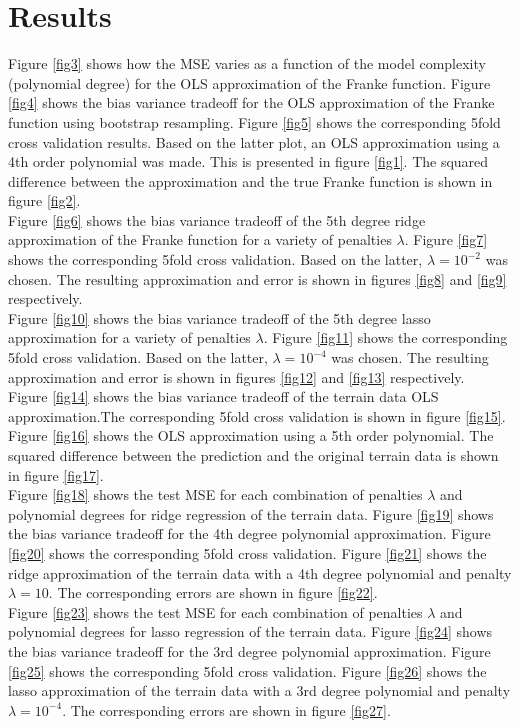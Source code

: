 \documentclass[notitlepage, reprint, nofootinbib]{revtex4-1}
\begin{document}
\section{Results}
Figure \ref{fig3} shows how the MSE varies as a function of the model complexity (polynomial degree) for the OLS approximation of the Franke function. Figure \ref{fig4} shows the bias variance tradeoff for the OLS approximation of the Franke function using bootstrap resampling. Figure \ref{fig5} shows the corresponding 5fold cross validation results. Based on the latter plot, an OLS approximation using a 4th order polynomial was made. This is presented in figure \ref{fig1}. The squared difference between the approximation and the true Franke function is shown in figure \ref{fig2}. \\[2mm]
Figure \ref{fig6} shows the bias variance tradeoff of the 5th degree ridge approximation of the Franke function for a variety of penalties $\lambda$. Figure \ref{fig7} shows the corresponding 5fold cross validation. Based on the latter, $\lambda=10^{-2}$ was chosen. The resulting approximation and error is shown in figures \ref{fig8} and \ref{fig9} respectively. \\[2mm]
Figure \ref{fig10} shows the bias variance tradeoff of the 5th degree lasso approximation for a variety of penalties $\lambda$. Figure \ref{fig11} shows the corresponding 5fold cross validation. Based on the latter, $\lambda=10^{-4}$ was chosen. The resulting approximation and error is shown in figures \ref{fig12} and \ref{fig13} respectively. \\[2mm]
Figure \ref{fig14} shows the bias variance tradeoff of the terrain data OLS approximation.The corresponding 5fold cross validation is shown in figure \ref{fig15}. Figure \ref{fig16} shows the OLS approximation using a 5th order polynomial. The squared difference between the prediction and the original terrain data is shown in figure \ref{fig17}.\\[2mm]
Figure \ref{fig18} shows the test MSE for each combination of penalties $\lambda$ and polynomial degrees for ridge regression of the terrain data. Figure \ref{fig19} shows the bias variance tradeoff for the 4th degree polynomial approximation. Figure \ref{fig20} shows the corresponding 5fold cross validation. Figure \ref{fig21} shows the ridge approximation of the terrain data with a 4th degree polynomial and penalty $\lambda=10$. The corresponding errors are shown in figure \ref{fig22}.\\[2mm]
Figure \ref{fig23} shows the test MSE for each combination of penalties $\lambda$ and polynomial degrees for lasso regression of the terrain data. Figure \ref{fig24} shows the bias variance tradeoff for the 3rd degree polynomial approximation. Figure \ref{fig25} shows the corresponding 5fold cross validation. Figure \ref{fig26} shows the lasso approximation of the terrain data with a 3rd degree polynomial and penalty $\lambda=10^{-4}$. The corresponding errors are shown in figure \ref{fig27}.
\end{document}
